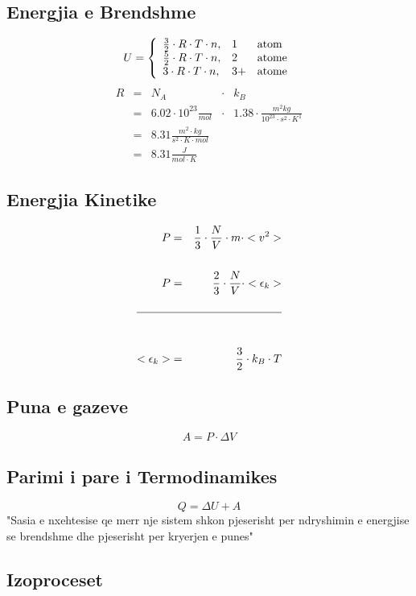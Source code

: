 \documentclass[a4paper, twocolumn]{article}
\begin{document}
\subsection{Energjia e Brendshme}
\[
U = \left\{
\begin{array}{l l l}
		\frac{3}{2}\cdot R\cdot T\cdot n, &1&\text{atom} \\
		\frac{5}{2}\cdot R\cdot T\cdot n, &2&\text{atome}\\
		3\cdot R\cdot T\cdot n, &3+&\text{atome}\\
\end{array}
\right.
\]
\[\begin{array}{ccccc}
	R&=&N_{A}&\cdot &k_{B}\\
	 &=&6.02\cdot 10^{23} \frac{}{mol} &\cdot & 1.38 \cdot \frac{m^2 kg}{10^{23}\cdot s^{2}\cdot K^{1}}   \\
	 &=&8.31 \frac{m^2\cdot kg}{s^{2}\cdot K\cdot mol}\\
	 &=&8.31 \frac{J}{mol\cdot K}
\end{array}
\]
\subsection{Energjia Kinetike}
\begin{eqnarray*}
	P &=& \frac{1}{3} \cdot  \frac{N}{V} \cdot m \cdot <v^2>\\
	  \\
	P &=& \frac{2}{3} \cdot \frac{N}{V} \cdot <\epsilon_{k}>\\
	  \\
	 \hline \\
	\\
	< \epsilon_{k}> &=& \frac{3}{2}\cdot k_{B}\cdot T\\
\end{eqnarray*}
\subsection{Puna e gazeve}
\[
A=P\cdot \Delta V
\]
\subsection{Parimi i pare i Termodinamikes}
\[
Q=\Delta U + A
\]
"Sasia e nxehtesise qe merr nje sistem shkon pjeserisht per ndryshimin e energjise se brendshme dhe pjeserisht per kryerjen e punes"
\subsection{Izoproceset}
\begingroup
\end{document}
